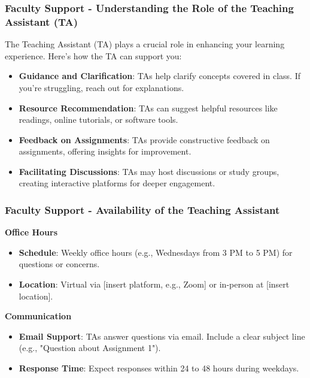 \documentclass[aspectratio=169]{beamer}
\begin{document}
\begin{frame}[fragile]
    \frametitle{Faculty Support - Understanding the Role of the Teaching Assistant (TA)}
    
    The Teaching Assistant (TA) plays a crucial role in enhancing your learning experience. Here’s how the TA can support you:
    
    \begin{itemize}
        \item \textbf{Guidance and Clarification}: TAs help clarify concepts covered in class. If you're struggling, reach out for explanations.
        
        \item \textbf{Resource Recommendation}: TAs can suggest helpful resources like readings, online tutorials, or software tools.
        
        \item \textbf{Feedback on Assignments}: TAs provide constructive feedback on assignments, offering insights for improvement.
        
        \item \textbf{Facilitating Discussions}: TAs may host discussions or study groups, creating interactive platforms for deeper engagement.
    \end{itemize}
    
\end{frame}

\begin{frame}[fragile]
    \frametitle{Faculty Support - Availability of the Teaching Assistant}
    
    \textbf{Office Hours}
    \begin{itemize}
        \item \textbf{Schedule}: Weekly office hours (e.g., Wednesdays from 3 PM to 5 PM) for questions or concerns.
        
        \item \textbf{Location}: Virtual via [insert platform, e.g., Zoom] or in-person at [insert location].
    \end{itemize}

    \textbf{Communication}
    \begin{itemize}
        \item \textbf{Email Support}: TAs answer questions via email. Include a clear subject line (e.g., "Question about Assignment 1").
        
        \item \textbf{Response Time}: Expect responses within 24 to 48 hours during weekdays.
    \end{itemize}
    
\end{frame}
\end{document}
